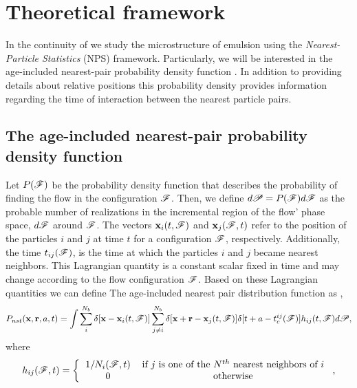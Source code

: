 \section{Theoretical framework}
\label{sec:Theory}

In the continuity of \citet{fintzi2024buoyancy} we study the microstructure of emulsion using the \textit{Nearest-Particle Statistics} (NPS) framework. 
Particularly, we will be interested in the age-included nearest-pair probability density function \citep{zhang2021ensemble}. 
In addition to providing details about relative positions this probability density provides information regarding the time of interaction between the nearest particle pairs. 

\subsection{The age-included nearest-pair probability density function}
Let $P(\mathscr{F})$ be the probability density function that describes the probability of finding the flow in the configuration $\mathscr{F}$.
Then, we define $d\mathscr{P} = P(\mathscr{F})d\mathscr{F}$ as the probable number of realizations in the incremental region of the flow' phase space, $d\mathscr{F}$ around $\mathscr{F}$.
The vectors  $\textbf{x}_i(t,\mathscr{F})$ and $\textbf{x}_j(\mathscr{F},t)$ refer to the position of the particles $i$ and $j$ at time $t$ for a configuration $\mathscr{F}$, respectively. 
Additionally, the time $t_{ij}(\mathscr{F})$, is the time at which the particles $i$ and $j$ became nearest neighbors.
This Lagrangian quantity is a constant scalar fixed in time and may change according to the flow configuration $\mathscr{F}$.
Based on these Lagrangian quantities we can define The age-included nearest pair distribution function as \citep{zhang2023evolution},
\begin{equation}
    P_{nst}(\textbf{x},\textbf{r},a,t) =
    \int \sum_{i}^{N_b}\delta[\textbf{x}-\textbf{x}_i(t,\FF)]
    \sum_{j\neq i}^{N_b}\delta[\textbf{x}+\textbf{r}-\textbf{x}_j(t,\FF)]
    \delta[t+a-t_c^{ij}(\FF)] 
    h_{ij} (t,\FF)
    d\mathscr{P},
    \label{eq:P_nstij}
\end{equation}
where
\begin{equation*}
    h_{ij}(\FF,t)
    = \left\{
        \begin{tabular}{cc}
            $1/N_i(\FF,t)$ & if $j$ is one of the $N^{th}$ nearest neighbors of $i$ \\
            0& otherwise
        \end{tabular}
        \right.,
\end{equation*}

